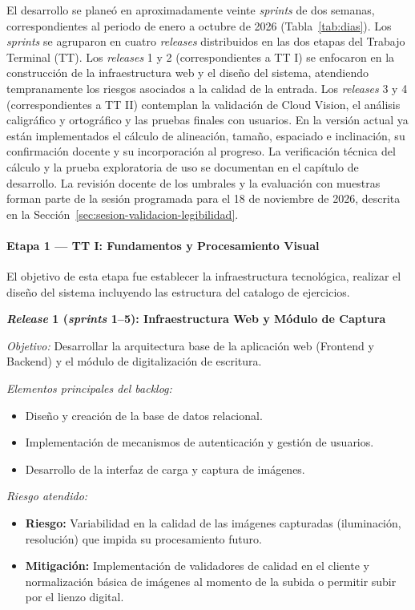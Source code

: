 El desarrollo se planeó en aproximadamente veinte \textit{sprints} de dos semanas,
correspondientes al periodo de enero a octubre de 2026 (Tabla~\ref{tab:dias}).
Los \textit{sprints} se agruparon en cuatro \textit{releases} distribuidos en las dos
etapas del Trabajo Terminal (TT). Los \textit{releases} 1 y 2 (correspondientes a TT I)
se enfocaron en la construcción de la infraestructura web y el diseño del sistema, atendiendo tempranamente los riesgos asociados a la
calidad de la entrada. Los \textit{releases} 3 y 4 (correspondientes a TT II) contemplan
la validación de Cloud Vision, el análisis caligráfico y ortográfico y las pruebas
finales con usuarios. En la versión actual ya están implementados el cálculo de
alineación, tamaño, espaciado e inclinación, su confirmación docente y su incorporación
al progreso. La verificación técnica del cálculo y la prueba exploratoria de uso se
documentan en el capítulo de desarrollo. La revisión docente de los umbrales y la
evaluación con muestras forman parte de la sesión programada para el 18 de noviembre
de 2026, descrita en la Sección~\ref{sec:sesion-validacion-legibilidad}.

\paragraph{Etapa 1 — TT I: Fundamentos y Procesamiento Visual}

El objetivo de esta etapa fue establecer la infraestructura tecnológica, realizar el diseño del sistema incluyendo las estructura del catalogo de ejercicios.

\textbf{\textit{Release} 1 (\textit{sprints} 1–5): Infraestructura Web y Módulo de Captura}

\textit{Objetivo:} Desarrollar la arquitectura base de la aplicación web (Frontend y
Backend) y el módulo de digitalización de escritura.

\textit{Elementos principales del backlog:}
\begin{itemize}
    \item Diseño y creación de la base de datos relacional.
    \item Implementación de mecanismos de autenticación y gestión de usuarios.
    \item Desarrollo de la interfaz de carga y captura de imágenes.
\end{itemize}

\textit{Riesgo atendido:}
\begin{itemize}
    \item \textbf{Riesgo:} Variabilidad en la calidad de las imágenes capturadas
    (iluminación, resolución) que impida su procesamiento futuro.
    \item \textbf{Mitigación:} Implementación de validadores de calidad en el cliente
    y normalización básica de imágenes al momento de la subida o permitir subir por el lienzo digital.
\end{itemize}

